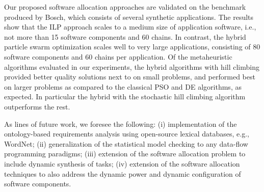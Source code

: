 Our proposed software allocation approaches are validated on the \autosar{} benchmark produced by Bosch, which consists of several synthetic applications. The results show that the ILP approach scales to a medium size of application software, i.e., not more than 15 software components and 60 chains. In contrast, the hybrid particle swarm optimization scales well to very large applications, consisting of 80 software components and 60 chains per application. Of the metaheuristic algorithms evaluated in our experiments, the hybrid \pso{} algorithms with hill climbing provided better quality solutions next to \ilp{} on small problems, and performed best on larger problems as compared to the classical PSO and DE algorithms, as expected. In particular the hybrid \pso{} with the stochastic hill climbing algorithm outperforms the rest.

As lines of future work, we foresee the following: (i) implementation of the ontology-based requirements analysis using open-source lexical databases, e.g., WordNet; (ii) generalization of the statistical model checking to any data-flow programming paradigms; (iii) extension of the software allocation problem to include dynamic synthesis of tasks; (iv) extension of the software allocation techniques to also address the dynamic power and dynamic configuration of software components. 
